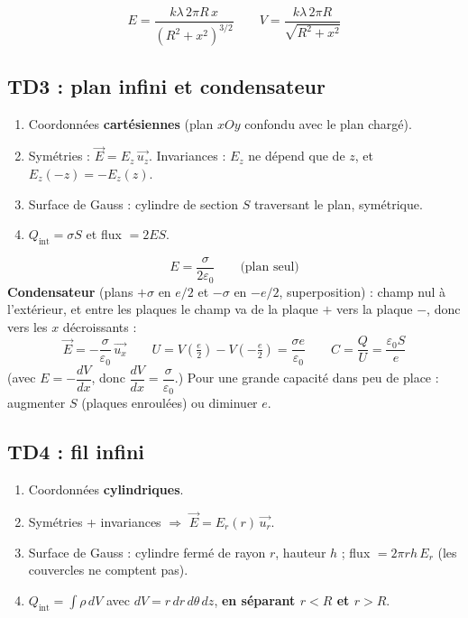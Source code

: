 \documentclass[11pt,a4paper]{article}
\newcommand{\vect}[1]{\overrightarrow{#1}}
\newcommand{\ur}{\vect{u_r}}
\newcommand{\uz}{\vect{u_z}}
\newcommand{\ux}{\vect{u_x}}
\newcommand{\E}{\vect{E}}
\newcommand{\eps}{\varepsilon_0}
\newcommand{\Qint}{Q_{\mathrm{int}}}
\begin{document}
\begin{formule}
\[
E=\frac{k\lambda\,2\pi R\,x}{(R^2+x^2)^{3/2}}
\qquad
V=\frac{k\lambda\,2\pi R}{\sqrt{R^2+x^2}}
\]
\end{formule}

\subsection{TD3 : plan infini et condensateur}

\begin{methode}
\begin{enumerate}[leftmargin=1.5em]
  \item Coordonnées \textbf{cartésiennes} (plan $xOy$ confondu avec le plan chargé).
  \item Symétries : $\E=E_z\,\uz$. Invariances : $E_z$ ne dépend que de $z$, et $E_z(-z)=-E_z(z)$.
  \item Surface de Gauss : cylindre de section $S$ traversant le plan, symétrique.
  \item $\Qint=\sigma S$ et flux $=2ES$.
\end{enumerate}
\end{methode}

\begin{formule}[Résultats]
\[
E=\frac{\sigma}{2\eps}
\qquad\text{(plan seul)}
\]
\textbf{Condensateur} (plans $+\sigma$ en $e/2$ et $-\sigma$ en $-e/2$, superposition) : champ nul à l'extérieur, et entre les plaques le champ va de la plaque $+$ vers la plaque $-$, donc vers les $x$ décroissants :
\[
\E=-\frac{\sigma}{\eps}\,\ux
\qquad
U=V\!\left(\tfrac e2\right)-V\!\left(-\tfrac e2\right)=\frac{\sigma e}{\eps}
\qquad
C=\frac{Q}{U}=\frac{\eps S}{e}
\]
(avec $E=-\dfrac{dV}{dx}$, donc $\dfrac{dV}{dx}=\dfrac{\sigma}{\eps}$.)
Pour une grande capacité dans peu de place : augmenter $S$ (plaques enroulées) ou diminuer $e$.
\end{formule}

\subsection{TD4 : fil infini}

\begin{methode}
\begin{enumerate}[leftmargin=1.5em]
  \item Coordonnées \textbf{cylindriques}.
  \item Symétries + invariances $\Rightarrow$ $\E=E_r(r)\,\ur$.
  \item Surface de Gauss : cylindre fermé de rayon $r$, hauteur $h$ ; flux $=2\pi r h\,E_r$ (les couvercles ne comptent pas).
  \item $\Qint=\displaystyle\int\rho\,dV$ avec $dV=r\,dr\,d\theta\,dz$, \textbf{en séparant $r<R$ et $r>R$}.
\end{enumerate}
\end{methode}
\end{document}
